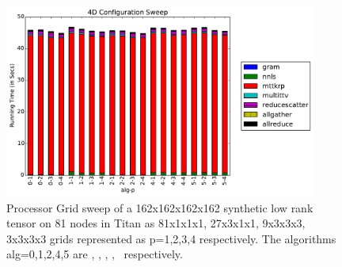 \begin{figure}
\includegraphics[width=\textwidth, height=2.5in]{data/plots/confsweep4d.pdf}
\caption{Processor Grid sweep of a 162x162x162x162 synthetic low rank tensor on 81 nodes in Titan as 81x1x1x1, 27x3x1x1, 9x3x3x3, 3x3x3x3 grids represented as p=1,2,3,4 respectively. The algorithms alg=0,1,2,4,5 are \MU, \HALS, \BPP, \ADMM, \Nestrov\ respectively.}
\label{fig:confsweep4D}
\end{figure}



